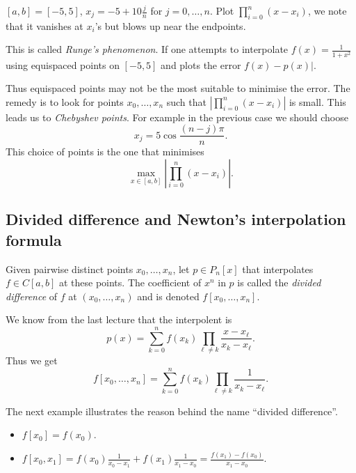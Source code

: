 \documentclass[a4paper]{article}
\begin{document}
\begin{eg}
  \([a, b] = [-5, 5]\), \(x_j = -5 + 10 \frac{j}{n}\) for \(j = 0, \dots, n\). Plot \(\prod_{i = 0}^n(x - x_i)\), we note that it vanishes at \(x_i\)'s but blows up near the endpoints.
\end{eg}

This is called \emph{Runge's phenomenon}. If one attempts to interpolate \(f(x) = \frac{1}{1 + x^2}\) using equispaced points on \([-5, 5]\) and plots the error \(f(x) - p(x)|\).

Thus equispaced points may not be the most suitable to minimise the error. The remedy is to look for points \(x_0, \dots, x_n\) such that \(|\prod_{i = 0}^n(x - x_i)|\) is small. This leads us to \emph{Chebyshev points}. For example in the previous case we should choose
\[
  x_j = 5 \cos \frac{(n - j)\pi}{n}.
\]
This choice of points is the one that minimises
\[
  \max_{x \in [a, b]} \left| \prod_{i =0}^n(x - x_i) \right|.
\]

\subsection{Divided difference and Newton's interpolation formula}

\begin{definition}
  Given pairwise distinct points \(x_0, \dots, x_n\), let \(p \in P_n[x]\) that interpolates \(f \in C[a, b]\) at these points. The coefficient of \(x^n\) in \(p\) is called the \emph{divided difference} of \(f\) at \((x_0, \dots, x_n)\) and is denoted \(f[x_0, \dots, x_n]\).
\end{definition}

We know from the last lecture that the interpolent is
\[
  p(x) = \sum_{k = 0}^n f(x_k) \prod_{\ell \neq k} \frac{x - x_\ell}{x_k - x_\ell}.
\]
Thus we get
\[
  f[x_0, \dots, x_n] = \sum_{k = 0}^n f(x_k) \prod_{\ell \neq k} \frac{1}{x_k - x_\ell}.
\]

The next example illustrates the reason behind the name ``divided difference''.

\begin{eg}\leavevmode
  \begin{itemize}
  \item \(f[x_0] = f(x_0)\).
  \item \(f[x_0, x_1] = f(x_0)\frac{1}{x_0 - x_1} + f(x_1)\frac{1}{x_1 - x_0} = \frac{f(x_1) - f(x_0)}{x_1 - x_0}\).
  \end{itemize}
\end{eg}
\end{document}
